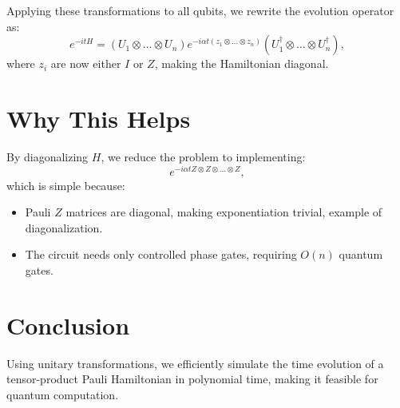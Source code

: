 \documentclass{article}
\begin{document}
Applying these transformations to all qubits, we rewrite the evolution operator as:
\begin{equation}
  e^{-itH} = (U_1 \otimes \dots \otimes U_n) e^{-i\alpha t (z_1 \otimes \dots \otimes z_n)} (U_1^\dagger \otimes \dots \otimes U_n^\dagger),
\end{equation}
where $z_i$ are now either $I$ or $Z$, making the Hamiltonian diagonal.

\section{Why This Helps}
By diagonalizing $H$, we reduce the problem to implementing:
\begin{equation}
  e^{-i\alpha t Z \otimes Z \otimes \dots \otimes Z},
\end{equation}
which is simple because:
\begin{itemize}
\item Pauli $Z$ matrices are diagonal, making exponentiation trivial, example of diagonalization.
\item The circuit needs only controlled phase gates, requiring $O(n)$ quantum gates.
\end{itemize}

\section{Conclusion}
Using unitary transformations, we efficiently simulate the time evolution of a tensor-product Pauli Hamiltonian in polynomial time, making it feasible for quantum computation.
\end{document}
